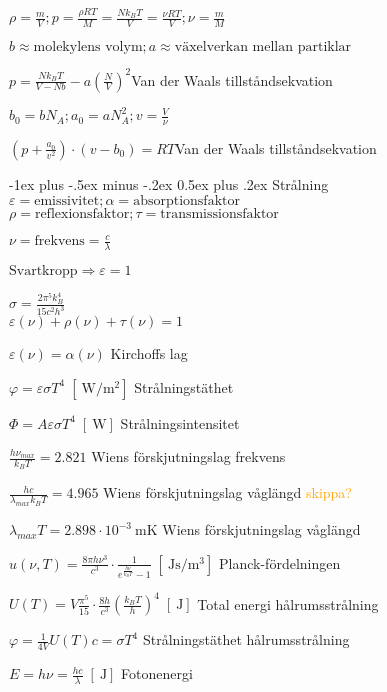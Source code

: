\documentclass[10pt,landscape]{article}
\makeatletter
\newcommand{\unit}[1]{
\;[\SI{}{#1}]
}
\renewcommand{\section}{\@startsection{section}{1}{0mm}%
                                {-1ex plus -.5ex minus -.2ex}%
                                {0.5ex plus .2ex}%
                                {\normalfont\large\bfseries}
                                }
\makeatother
\begin{document}
\begin{multicols}{3}
$\displaystyle \rho = \frac{m}{V}; p = \frac{\rho R T}{M} = \frac{Nk_BT}{V} = \frac{\nu R T}{V}; \nu = \frac{m}{M}$

$\displaystyle b \approx \text{molekylens volym}; a \approx \text{växelverkan mellan partiklar}$

$\displaystyle p = \frac{Nk_BT}{V - Nb} - a\left( \frac{N}{V} \right)^2$\hfill Van der Waals tillståndsekvation

$b_0 = bN_A; a_0 = aN_A^2; v = \frac{V}{\nu}$

$\displaystyle \left(p + \frac{a_0}{v^2} \right)\cdot (v - b_0) = RT$\hfill Van der Waals tillståndsekvation

\section{Strålning}
$\varepsilon = \text{emissivitet}; \alpha = \text{absorptionsfaktor}$\\
$\rho = \text{reflexionsfaktor}; \tau = \text{transmissionsfaktor}$

$\nu = \text{frekvens} = \frac{c}{\lambda}$

$\text{Svartkropp} \Rightarrow \varepsilon = 1$

$\sigma = \frac{2\pi^5 k_B^4}{15 c^2 h^3}$
$$$$
$\varepsilon(\nu) + \rho(\nu) + \tau(\nu) = 1$

$\varepsilon(\nu) = \alpha(\nu) $  \hfill Kirchoffs lag


$\varphi = \varepsilon \sigma T^4 \unit{\watt\per\meter^2}$  \hfill Strålningstäthet


$\Phi = A \varepsilon \sigma T^4 \unit{\watt}$  \hfill Strålningsintensitet


$\frac{h\nu_{max}}{k_B T} = 2.821$  \hfill Wiens förskjutningslag frekvens

$\frac{hc}{\lambda_{max}k_B T} = 4.965$  \hfill Wiens förskjutningslag våglängd \textcolor{orange}{skippa?}

$\lambda_{max}T = 2.898\cdot 10^{-3} \SI{}{\meter\kelvin}$  \hfill Wiens förskjutningslag våglängd

$\displaystyle u(\nu, T) = \frac{8\pi h \nu^3}{c^3} \cdot \frac{1}{e^{\frac{h\nu}{k_BT}} - 1} \unit{\joule\second\per\cubic\meter}$  \hfill Planck-fördelningen


$\displaystyle U(T) = V \frac{\pi^5}{15} \cdot \frac{8h}{c^3}\left(\frac{k_BT}{h}\right)^4 \unit{\joule}$  \hfill Total energi hålrumsstrålning


$\varphi = \frac{1}{4V} U(T)c = \sigma T^4$  \hfill Strålningstäthet hålrumsstrålning


$E = h\nu = \frac{hc}{\lambda} \unit{\joule}$  \hfill Fotonenergi


\end{multicols}
\end{document}
